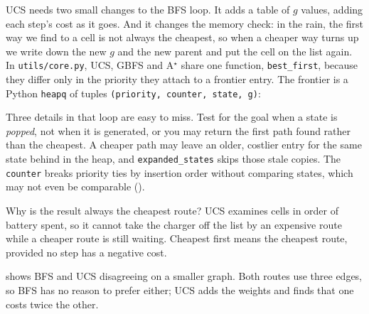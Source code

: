 UCS needs two small changes to the BFS loop. It adds a table of $g$ values, adding each step's cost as it goes. And it changes the memory check: in the rain, the first way we find to a cell is not always the cheapest, so when a cheaper way turns up we write down the new $g$ and the new parent and put the cell on the list again. In \texttt{utils/core.py}, UCS, GBFS and A$^\star$ share one function, \texttt{best\_first}, because they differ only in the priority they attach to a frontier entry. The frontier is a Python \texttt{heapq} of tuples \texttt{(priority, counter, state, g)}:



Three details in that loop are easy to miss. Test for the goal when a state is \emph{popped}, not when it is generated, or you may return the first path found rather than the cheapest. A cheaper path may leave an older, costlier entry for the same state behind in the heap, and \texttt{expanded\_states} skips those stale copies. The \texttt{counter} breaks priority ties by insertion order without comparing states, which may not even be comparable ().

Why is the result always the cheapest route? UCS examines cells in order of battery spent, so it cannot take the charger off the list by an expensive route while a cheaper route is still waiting. Cheapest first means the cheapest route, provided no step has a negative cost.

 shows BFS and UCS disagreeing on a smaller graph. Both routes use three edges, so BFS has no reason to prefer either; UCS adds the weights and finds that one costs twice the other.

